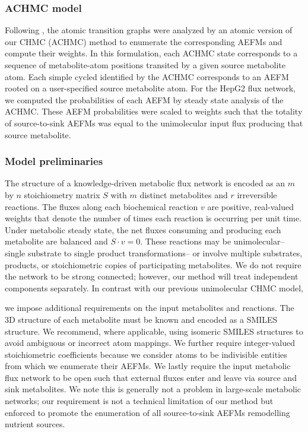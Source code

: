 \documentclass[12pt]{article}
\begin{document}

\subsubsection*{ACHMC model}

Following \citeauthor{ChitpinJustinG2023AMct}, the atomic transition
graphs were analyzed by an atomic version of our CHMC (ACHMC) method to
enumerate the corresponding AEFMs and compute their weights. In this
formulation, each ACHMC state corresponds to a sequence of metabolite-atom
positions transited by a given source metabolite atom. Each simple cycled
identified by the ACHMC corresponds to an AEFM rooted on a user-specified
source metabolite atom. For the HepG2 flux network, we computed the
probabilities of each AEFM by steady state analysis of the ACHMC. These
AEFM probabilities were scaled to weights such that the totality of
source-to-sink AEFMs was equal to the unimolecular input flux producing
that source metabolite.


\iffalse

\subsubsection*{Model preliminaries}

The structure of a knowledge-driven metabolic flux network is encoded as
an $m$ by $n$ stoichiometry matrix $S$ with $m$ distinct metabolites and
$r$ irreversible reactions. The fluxes along each biochemical reaction $v$ are
positive, real-valued weights that denote the number of times each
reaction is occurring per unit time. Under metabolic steady state, the net
fluxes consuming and producing each metabolite are balanced and $S \cdot
v = 0$. These reactions may be unimolecular--single substrate to single
product transformations-- or involve multiple substrates, products, or
stoichiometric copies of participating metabolites. We do not require the
network to be strong connected; however, our method will treat independent
components separately. In contrast with our previous unimolecular CHMC
model,

we impose additional requirements on the input metabolites and reactions.
The 3D structure of each metabolite must be known and encoded as a SMILES
structure. We recommend, where applicable, using isomeric SMILES
structures to avoid ambiguous or incorrect atom mappings. We further
require integer-valued stoichiometric coefficients because we consider
atoms to be indivisible entities from which we enumerate their AEFMs. We
lastly require the input metabolic flux network to be open such that
external fluxes enter and leave via source and sink metabolites. We note
this is generally not a problem in large-scale metabolic networks; our
requirement is not a technical limitation of our method but enforced to
promote the enumeration of all source-to-sink AEFMs remodelling nutrient
sources.
\end{document}
